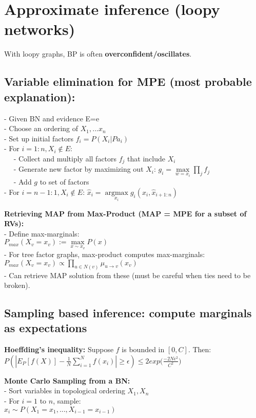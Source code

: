 
\section{Approximate inference (loopy networks)}
With loopy graphs, BP is often \textbf{overconfident/oscillates}.
\subsection{Variable elimination for MPE (most probable explanation):}

- Given BN and evidence E=e\\
- Choose an ordering of $X_1, ... x_n$\\
- Set up initial factors $f_i=P(X_i|Pa_i)$\\
- For $i=1:n, X_i \notin  E$:\\
$\quad$ - Collect and multiply all factors $f_j$ that include $X_i$\\
$\quad$ - Generate new factor by maximizing out $X_i$:
        $g_i=\underset{w=x_i}{\operatorname{max}}\prod_j f_j$\\
$\quad$ - Add $g$ to set of factors\\
- For $i=n-1:1, X_i\notin E$:
    $\hat{x}_i=\underset{x_i}{\operatorname{argmax}}g_i(x_i, \hat{x}_{i+1:n})$

\textbf{Retrieving MAP from Max-Product (MAP = MPE for a subset of RVs):}\\
- Define max-marginals:\\
    $P_{max}(X_v=x_v):=\underset{x\sim x_v}{\operatorname{max}}P(x)$\\
- For tree factor graphs, max-product computes max-marginals:\\
    $P_{max}(X_v=x_v)	\propto \prod_{u \in N(v)} \mu_{u \rightarrow v}(x_v)$\\
- Can retrieve MAP solution from these (must be careful when ties need to be broken).


\subsection{Sampling based inference: compute marginals as expectations}
\textbf{Hoeffding's inequality:} Suppose $f$ is bounded in $[0, C]$. Then:\\
$P(|E_P[f(X)]-\frac{1}{N}\sum_{i=1}^N f(x_i)|\geq\epsilon) \leq 2exp\big( \frac{-2N\epsilon^2}{C^2}\big)$

\textbf{Monte Carlo Sampling from a BN:}\\
- Sort variables in topological ordering $X_1, X_n$\\
- For $i=1$ to $n$, sample:\\
$x_i \sim P(X_1=x_1, ..., X_{i-1}=x_{i-1})$

